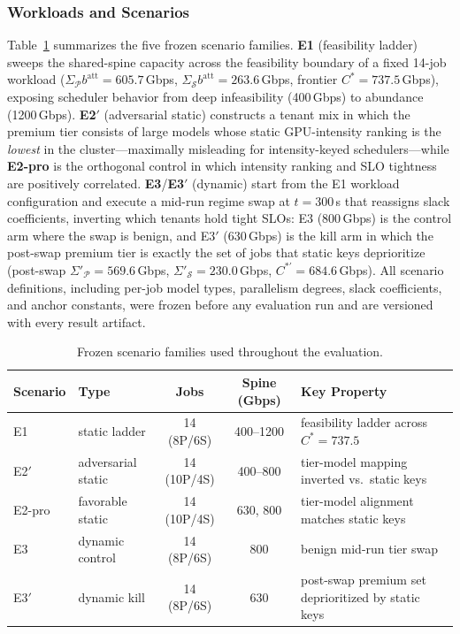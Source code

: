 \subsubsection{Workloads and Scenarios}
\label{sec:workloads}

Table~\ref{tab:workloads} summarizes the five frozen scenario families. \textbf{E1} (feasibility ladder) sweeps the shared-spine capacity across the feasibility boundary of a fixed 14-job workload ($\Sigma_{\mathcal{P}}b^{\mathrm{att}}=605.7$\,Gbps, $\Sigma_{\mathcal{S}}b^{\mathrm{att}}=263.6$\,Gbps, frontier $C^{*}=737.5$\,Gbps), exposing scheduler behavior from deep infeasibility (400\,Gbps) to abundance (1200\,Gbps). \textbf{E2}$'$ (adversarial static) constructs a tenant mix in which the premium tier consists of large models whose static GPU-intensity ranking is the \emph{lowest} in the cluster---maximally misleading for intensity-keyed schedulers---while \textbf{E2-pro} is the orthogonal control in which intensity ranking and SLO tightness are positively correlated. \textbf{E3}/\textbf{E3}$'$ (dynamic) start from the E1 workload configuration and execute a mid-run regime swap at $t{=}300$\,s that reassigns slack coefficients, inverting which tenants hold tight SLOs: E3 ($800$\,Gbps) is the control arm where the swap is benign, and E3$'$ ($630$\,Gbps) is the kill arm in which the post-swap premium tier is exactly the set of jobs that static keys deprioritize (post-swap $\Sigma'_{\mathcal{P}}=569.6$\,Gbps, $\Sigma'_{\mathcal{S}}=230.0$\,Gbps, $C^{*\prime}=684.6$\,Gbps). All scenario definitions, including per-job model types, parallelism degrees, slack coefficients, and anchor constants, were frozen before any evaluation run and are versioned with every result artifact.

\begin{table}[t]
\centering
\caption{Frozen scenario families used throughout the evaluation.}
\label{tab:workloads}
\scriptsize
\setlength{\tabcolsep}{3pt}
\begin{tabular}{@{}l l c c p{2.2cm}@{}}
\toprule
\textbf{Scenario} & \textbf{Type} & \textbf{Jobs} & \textbf{Spine (Gbps)} & \textbf{Key Property} \\
\midrule
E1  & static ladder & 14 (8P/6S) & 400--1200 & feasibility ladder across $C^{*}{=}737.5$ \\
E2$'$ & adversarial static & 14 (10P/4S) & 400--800 & tier-model mapping inverted vs.\ static keys \\
E2-pro & favorable static & 14 (10P/4S) & 630, 800 & tier-model alignment matches static keys \\
E3  & dynamic control & 14 (8P/6S) & 800 & benign mid-run tier swap \\
E3$'$ & dynamic kill & 14 (8P/6S) & 630 & post-swap premium set deprioritized by static keys \\
\bottomrule
\end{tabular}
\end{table}


